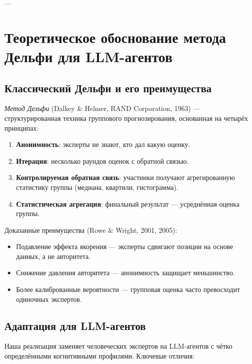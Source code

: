 ---


\section{Теоретическое обоснование метода Дельфи для LLM-агентов}

\subsection{Классический Дельфи и его преимущества}

\emph{Метод Дельфи} (Dalkey \& Helmer, RAND Corporation, 1963) — структурированная техника группового прогнозирования, основанная на четырёх принципах:

\begin{enumerate}
    \item \textbf{Анонимность}: эксперты не знают, кто дал какую оценку.
    \item \textbf{Итерация}: несколько раундов оценок с обратной связью.
    \item \textbf{Контролируемая обратная связь}: участники получают агрегированную статистику группы (медиана, квартили, гистограмма).
    \item \textbf{Статистическая агрегация}: финальный результат — усреднённая оценка группы.
\end{enumerate}

Доказанные преимущества (Rowe \& Wright, 2001, 2005):
\begin{itemize}
    \item Подавление эффекта якорения — эксперты сдвигают позиции на основе данных, а не авторитета.
    \item Снижение давления авторитета — анонимность защищает меньшинство.
    \item Более калиброванные вероятности — групповая оценка часто превосходит одиночных экспертов.
\end{itemize}

\subsection{Адаптация для LLM-агентов}

Наша реализация заменяет человеческих экспертов на LLM-агентов с чётко определёнными когнитивными профилями. Ключевые отличия:


